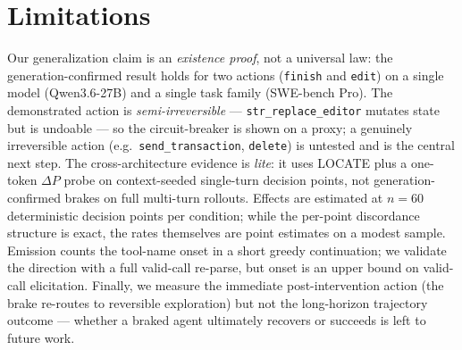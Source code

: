 \documentclass[11pt]{article}
\begin{document}
\section*{Limitations}
Our generalization claim is an \emph{existence proof}, not a universal law: the generation-confirmed result
holds for two actions (\texttt{finish} and \texttt{edit}) on a single model (Qwen3.6-27B) and a single task
family (SWE-bench Pro). The demonstrated action is \emph{semi-irreversible} --- \texttt{str\_replace\_editor}
mutates state but is undoable --- so the circuit-breaker is shown on a proxy; a genuinely irreversible action
(e.g.\ \texttt{send\_transaction}, \texttt{delete}) is untested and is the central next step. The
cross-architecture evidence is \emph{lite}: it uses LOCATE plus a one-token $\Delta P$ probe on
context-seeded single-turn decision points, not generation-confirmed brakes on full multi-turn rollouts.
Effects are estimated at $n{=}60$ deterministic decision points per condition; while the per-point discordance
structure is exact, the rates themselves are point estimates on a modest sample. Emission counts the tool-name
onset in a short greedy continuation; we validate the direction with a full valid-call re-parse, but onset is
an upper bound on valid-call elicitation. Finally, we measure the immediate post-intervention action (the brake
re-routes to reversible exploration) but not the long-horizon trajectory outcome --- whether a braked agent
ultimately recovers or succeeds is left to future work.


\end{document}
